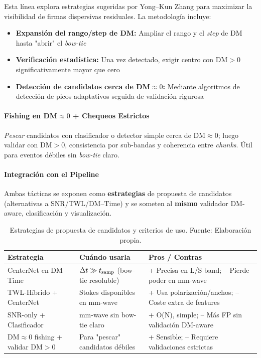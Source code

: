 Esta línea explora estrategias sugeridas por Yong–Kun Zhang \cite{zhang2024drafts} para maximizar la visibilidad de firmas dispersivas residuales. La metodología incluye:

\begin{itemize}
\item \textbf{Expansión del rango/step de DM:} Ampliar el rango y el \textit{step} de DM hasta "abrir" el \textit{bow-tie}
\item \textbf{Verificación estadística:} Una vez detectado, exigir centro con DM$>0$ significativamente mayor que cero
\item \textbf{Detección de candidatos cerca de DM$\approx 0$:} Mediante algoritmos de detección de picos adaptativos seguida de validación rigurosa
\end{itemize}

\paragraph{Fishing en DM$\approx 0$ + Chequeos Estrictos}

\textit{Pescar} candidatos con clasificador o detector simple cerca de DM$\approx 0$; luego validar con DM$>0$, consistencia por sub-bandas y coherencia entre \emph{chunks}. Útil para eventos débiles sin \textit{bow-tie} claro.

\paragraph{Integración con el Pipeline}

Ambas tácticas se exponen como \textbf{estrategias} de propuesta de candidatos (alternativas a SNR/TWL/DM--Time) y se someten al \textbf{mismo} validador DM-aware, clasificación y visualización.

\begin{table}[H] 
\centering 
\caption{\label{tab:estrategias} Estrategias de propuesta de candidatos y criterios de uso. Fuente: Elaboración propia.} 
\begin{tabular}{p{} p{} p{}} 
\toprule 
\textbf{Estrategia} & \textbf{Cuándo usarla} & \textbf{Pros / Contras} \\ 
\midrule 
CenterNet en DM--Time & $\Delta t \gg t_{\rm samp}$ (bow-tie resoluble) & + Precisa en L/S-band; -- Pierde poder en mm-wave \\ 
TWL-Híbrido + CenterNet & Stokes disponibles en mm-wave & + Usa polarización/anchos; -- Coste extra de features \\ 
SNR-only + Clasificador & mm-wave sin bow-tie claro & + O(N), simple; -- Más FP sin validación DM-aware \\ 
DM$\approx 0$ fishing + validar DM$>0$ & Para "pescar" candidatos débiles & + Sensible; -- Requiere validaciones estrictas \\ 
\bottomrule 
\end{tabular} 
\end{table}


